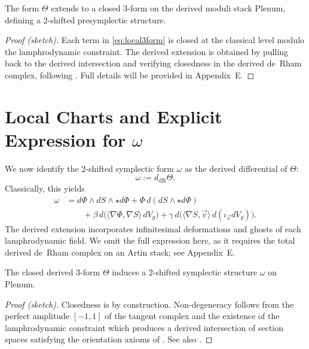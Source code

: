 \begin{proposition}
The form $\Theta$ extends to a closed $3$-form on the derived moduli
stack $\mathrm{Plenum}$, defining a $2$-shifted presymplectic structure.
\end{proposition}

\begin{proof}[Proof (sketch)]
Each term in \eqref{eq:local3form} is closed at the classical level
modulo the lamphrodynamic constraint. The derived extension is obtained
by pulling back to the derived intersection and verifying closedness in
the derived de~Rham complex, following \cite{PTVV13}. Full details will
be provided in Appendix~E.
\end{proof}


\section{Local Charts and Explicit Expression for $\omega$}

We now identify the $2$-shifted symplectic form $\omega$ as the derived
differential of $\Theta$:
\[
\omega := d_{\mathrm{dR}}\Theta.
\]
Classically, this yields
\begin{align}
\omega
&=
d\Phi\wedge dS\wedge \star d\Phi
+ \Phi\, d(dS\wedge \star d\Phi)
\\
& \qquad
+ \beta\, d\bigl(
\langle\nabla\Phi,\nabla S\rangle\, dV_g\bigr)
+ \gamma\, d\bigl(
\langle\nabla S,\vec v\rangle\, d(\iota_{\vec v}dV_g)
\bigr).
\end{align}
The derived extension incorporates infinitesimal deformations and ghosts
of each lamphrodynamic field. We omit the full expression here, as it
requires the total derived de~Rham complex on an Artin stack; see
Appendix~E.

\begin{theorem}
\label{thm:shifted}
The closed derived $3$-form $\Theta$ induces a
$2$-shifted symplectic structure $\omega$ on $\mathrm{Plenum}$.
\end{theorem}

\begin{proof}[Proof (sketch)]
Closedness is by construction. Non-degeneracy follows from the perfect
amplitude $[-1,1]$ of the tangent complex and the existence of
the lamphrodynamic constraint which produces a derived intersection of
section spaces satisfying the orientation axioms of \cite{PTVV13}.
See also \cite{ToenVezzosi-HAGII}.
\end{proof}

